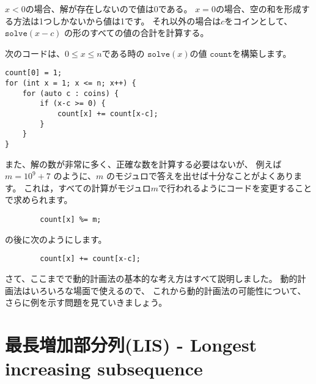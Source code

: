 $x < 0$の場合、解が存在しないので値は0である。
$x = 0$の場合、空の和を形成する方法は1つしかないから値は1です。
それ以外の場合は$c$をコインとして、$\texttt{solve}(x-c)$ の形のすべての値の合計を計算する。

次のコードは、$0 \le x \le n$である時の
$\texttt{solve}(x)$の値
$\texttt{count}$を構築します。 

\begin{lstlisting}
count[0] = 1;
for (int x = 1; x <= n; x++) {
    for (auto c : coins) {
        if (x-c >= 0) {
            count[x] += count[x-c];
        }
    }
}
\end{lstlisting}

また、解の数が非常に多く、正確な数を計算する必要はないが、
例えば $m=10^9+7$ のように、$m$ のモジュロで答えを出せば十分なことがよくあります。
これは，すべての計算がモジュロ$m$で行われるようにコードを変更することで求められます。

\begin{lstlisting}
        count[x] %= m;
\end{lstlisting}
の後に次のようにします。
\begin{lstlisting}
        count[x] += count[x-c];
\end{lstlisting}

さて、ここまでで動的計画法の基本的な考え方はすべて説明しました。
動的計画法はいろいろな場面で使えるので、
これから動的計画法の可能性について、
さらに例を示す問題を見ていきましょう。

\section{最長増加部分列(LIS) - Longest increasing subsequence}


